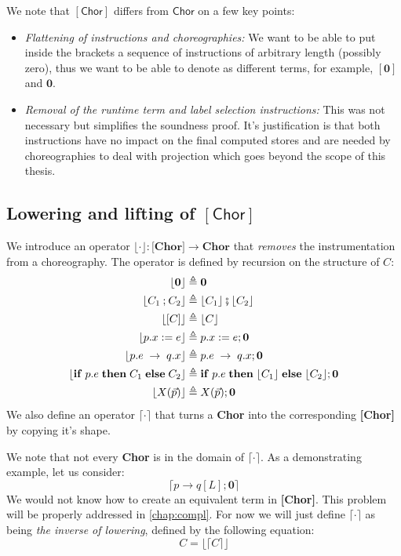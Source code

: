 \documentclass[12pt,a4paper,twoside]{book}
\begin{document}
We note that $\mathsf{[Chor]}$ differs from $\mathsf{Chor}$ on a few key points:
\begin{itemize}
	\item \emph{Flattening of instructions and choreographies:} We want to be able to put inside the brackets a sequence of instructions of arbitrary length (possibly zero), thus we want to be able to denote as different terms, for example, $[\boldsymbol{0}]$ and $\boldsymbol{0}$.
	\item \emph{Removal of the runtime term and label selection instructions:} This was not necessary but simplifies the soundness proof. It's justification is that both instructions have no impact on the final computed stores and are needed by choreographies to deal with projection\cite{montesi2023introduction} which goes beyond the scope of this thesis.
\end{itemize}

\subsection{Lowering and lifting of $\mathsf{[Chor]}$}
We introduce an operator $\lfloor \cdot \rfloor: \textbf{[Chor]} \rightarrow \textbf{Chor}$ that \emph{removes} the instrumentation from a choreography. The operator is defined by recursion on the structure of $C$:
\begin{align*}
\lfloor \boldsymbol{0}\rfloor & \triangleq \boldsymbol{0} \\
\lfloor C_1 \mathbin{;} C_2\rfloor & \triangleq \lfloor C_1 \rfloor \fatsemi \lfloor C_2 \rfloor\\
\lfloor [C] \rfloor & \triangleq \lfloor C \rfloor\\
	\lfloor p.x \mathrel{:=} e \rfloor & \triangleq p.x \mathrel{:=} e; \boldsymbol{0}\\
	\lfloor p.e \;\rightarrow\; q.x \rfloor & \triangleq p.e \;\rightarrow\; q.x; \boldsymbol{0}\\
\lfloor \mathbf{if}\; p.e\; \mathbf{then}\; C_1\; \mathbf{else}\; C_2 \rfloor
	& \triangleq \mathbf{if}\; p.e\; \mathbf{then}\; \lfloor C_1\rfloor\; \mathbf{else}\; \lfloor C_2 \rfloor; \boldsymbol{0}\\
	\lfloor X(\vec{p})\rfloor & \triangleq X(\vec{p}); \boldsymbol{0}
\end{align*}
We also define an operator $\lceil \cdot \rceil$ that turns a \textbf{Chor} into the corresponding \textbf{[Chor]} by copying it's shape.

We note that not every \textbf{Chor} is in the domain of $\lceil \cdot \rceil$.
As a demonstrating example, let us consider:
$$
\lceil p \rightarrow q[L]; \boldsymbol{0} \rceil
$$
We would not know how to create an equivalent term in \textbf{[Chor]}.
This problem will be properly addressed in \ref{chap:compl}. For now we will just define $\lceil \cdot \rceil$ as being \emph{the inverse of lowering}, defined by the following equation:
\begin{equation}\label{defs:lift_chor}
C = \lfloor \lceil C \rceil \rfloor
\end{equation}
\end{document}
